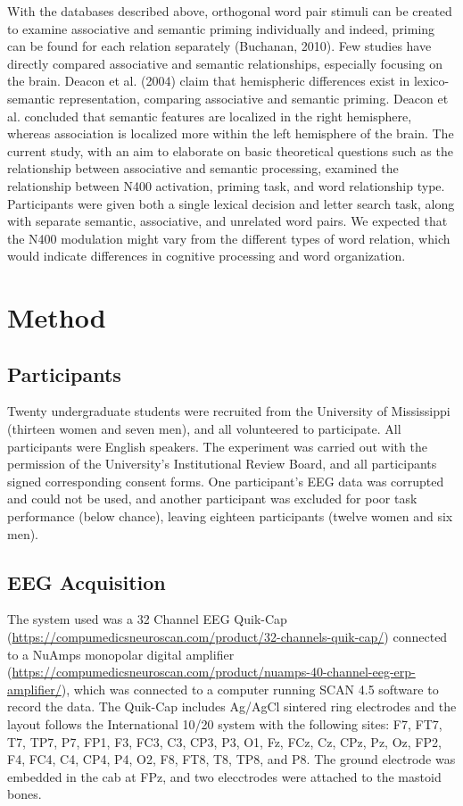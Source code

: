 \documentclass[english,man]{apa6}
\theoremstyle{definition}
\theoremstyle{definition}
\theoremstyle{definition}
\theoremstyle{remark}
\begin{document}
With the databases described above, orthogonal word pair stimuli can be
created to examine associative and semantic priming individually and
indeed, priming can be found for each relation separately (Buchanan,
2010). Few studies have directly compared associative and semantic
relationships, especially focusing on the brain. Deacon et al. (2004)
claim that hemispheric differences exist in lexico-semantic
representation, comparing associative and semantic priming. Deacon et
al. concluded that semantic features are localized in the right
hemisphere, whereas association is localized more within the left
hemisphere of the brain. The current study, with an aim to elaborate on
basic theoretical questions such as the relationship between associative
and semantic processing, examined the relationship between N400
activation, priming task, and word relationship type. Participants were
given both a single lexical decision and letter search task, along with
separate semantic, associative, and unrelated word pairs. We expected
that the N400 modulation might vary from the different types of word
relation, which would indicate differences in cognitive processing and
word organization.

\section{Method}\label{method}

\subsection{Participants}\label{participants}

Twenty undergraduate students were recruited from the University of
Mississippi (thirteen women and seven men), and all volunteered to
participate. All participants were English speakers. The experiment was
carried out with the permission of the University's Institutional Review
Board, and all participants signed corresponding consent forms. One
participant's EEG data was corrupted and could not be used, and another
participant was excluded for poor task performance (below chance),
leaving eighteen participants (twelve women and six men).

\subsection{EEG Acquisition}\label{eeg-acquisition}

The system used was a 32 Channel EEG Quik-Cap
(\url{https://compumedicsneuroscan.com/product/32-channels-quik-cap/})
connected to a NuAmps monopolar digital amplifier
(\url{https://compumedicsneuroscan.com/product/nuamps-40-channel-eeg-erp-amplifier/}),
which was connected to a computer running SCAN 4.5 software to record
the data. The Quik-Cap includes Ag/AgCl sintered ring electrodes and the
layout follows the International 10/20 system with the following sites:
F7, FT7, T7, TP7, P7, FP1, F3, FC3, C3, CP3, P3, O1, Fz, FCz, Cz, CPz,
Pz, Oz, FP2, F4, FC4, C4, CP4, P4, O2, F8, FT8, T8, TP8, and P8. The
ground electrode was embedded in the cab at FPz, and two elecctrodes
were attached to the mastoid bones.
\end{document}

